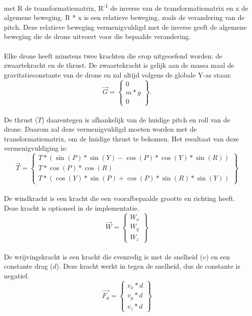 met R de transformatiematrix, R\textsuperscript{-1} de inverse van de transformatiematrix en x de algemene beweging. R * x is een relatieve beweging, zoals de verandering van de pitch. Deze relatieve beweging vermenigvuldigd met de inverse geeft de algemene beweging die de drone uitvoert voor die bepaalde verandering.
\\
\\
Elke drone heeft minstens twee krachten die erop uitgeoefend worden: de zwaartekracht en de thrust. De zwaartekracht is gelijk aan de massa maal de gravitatieconstante van de drone en zal altijd volgens de globale Y-as staan: \\
\begin{equation*} 
\vec{G} =
\begin{Bmatrix}
0 \\
m * g \\
0 
\end{Bmatrix}.
\end{equation*} 
\\
De thrust (\(T\)) daarentegen is afhankelijk van de huidige pitch en roll van de drone. Daarom zal deze vermenigvuldigd moeten worden met de transformatiematrix, om de huidige thrust te bekomen. Het resultaat van deze vermenigvuldiging is: 
\begin{equation*} 
\vec{T} = 
\begin{Bmatrix}
T*(\sin(P)*\sin(Y) - \cos(P)*\cos(Y)*\sin(R))\\ 
T*\cos(P)*\cos(R) \\
T*(\cos(Y)*\sin(P) + \cos(P)*\sin(R)*\sin(Y))
\end{Bmatrix}
\end{equation*}
\\
De windkracht is een kracht die een voorafbepaalde grootte en richting heeft. Deze kracht is optioneel in de implementatie. \\
\begin{equation*}
\vec{W} = 
\begin{Bmatrix}
W_x \\
W_y \\
W_z 
\end{Bmatrix}
\end{equation*}
\\
De wrijvingskracht is een kracht die evenredig is met de snelheid (\(v\)) en een constante drag (\(d\)). Deze kracht werkt in tegen de snelheid, dus de constante is negatief. \\
\begin{equation*}
\vec{F_d} = 
\begin{Bmatrix}
v_x * d \\
v_y * d \\
v_z * d
\end{Bmatrix}
\end{equation*} \\
